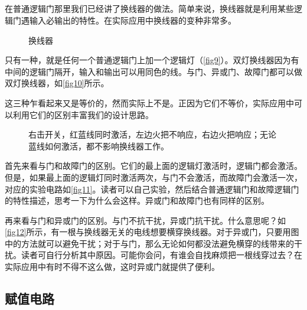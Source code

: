 \subsection{}
在普通逻辑门那里我们已经讲了换线器的做法。简单来说，换线器就是利用某些逻辑门遇输入必输出的特性。在实际应用中换线器的变种非常多。

\begin{figure}[!ht]
\centering
{}%
%
\caption{换线器}
\end{figure}

只有一种，就是任何一个普通逻辑门上加一个逻辑灯（\autoref{fig9}）。双灯换线器因为有中间的逻辑门隔开，输入和输出可以用同色的线。与门、异或门、故障门都可以做双灯换线器，如\autoref{fig10}所示。

这三种乍看起来又是等价的，然而实际上不是。正因为它们不等价，实际应用中可以利用它们的区别丰富我们的设计思路。

\begin{figure}[!ht]
\centering
{}%
%
\caption{\protect{}右击开关，红蓝线同时激活，左边火把不响应，右边火把响应；\protect{}无论蓝线如何激活，都不影响换线器工作。}
\end{figure}

首先来看与门和故障门的区别。它们的最上面的逻辑灯激活时，逻辑门都会激活。但是，如果最上面的逻辑灯同时激活两次，与门不会激活，而故障门会激活一次，对应的实验电路如\autoref{fig11}。读者可以自己实验，然后结合普通逻辑门和故障逻辑门的特性描述，思考一下为什么会这样。异或门和故障门也有同样的区别。

再来看与门和异或门的区别。与门不抗干扰，异或门抗干扰。什么意思呢？如\autoref{fig12}所示，有一根与换线器无关的电线想要横穿换线器。对于异或门，只要用图中的方法就可以避免干扰；对于与门，那么无论如何都没法避免横穿的线带来的干扰。读者可自行分析其中原因。可能你会问，有谁会自找麻烦把一根线穿过去？在实际应用中有时不得不这么做，这时异或门就提供了便利。

\subsection{赋值电路}\label{sec14}

